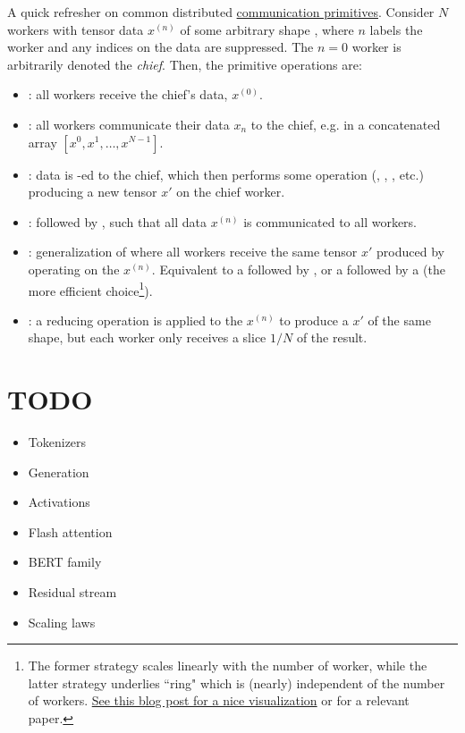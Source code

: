 \documentclass[11pt]{article}
\begin{document}
A quick refresher on common distributed
\href{https://docs.nvidia.com/deeplearning/nccl/user-guide/docs/usage/collectives.html}{communication
primitives}.  Consider $ N $ workers with tensor data $ x ^{ (n) }  $ of some arbitrary shape
, where $ n $ labels the worker and any indices on the data are suppressed. The $
n=0 $ worker is arbitrarily denoted the \textit{chief}.  Then, the primitive operations are:
\begin{itemize}
    \item {}: all workers receive  the chief's data, $ x ^{ (0) }  $.
    \item {}: all workers communicate their data $ x _{ n } $ to the chief, e.g. in a
        concatenated array $ [x ^{ 0 }, x ^{ 1 }, \ldots , x ^{ N-1 }] $.
    \item {}: data is -ed to the chief, which then performs some
        operation (, , , etc.) producing a new tensor $
        x' $ on the chief worker.
    \item {}:  followed by , such that all
        data $ x ^{ (n) } $ is communicated to all workers.
    \item {}: generalization of  where all
        workers receive the same tensor $ x' $ produced by operating on the $ x ^{ (n) } $.
        Equivalent to a  followed by , or a
         followed by a  (the more efficient
        choice\footnote{The former strategy scales linearly with the number of worker, while the
            latter strategy underlies ``ring"  which is (nearly) independent of
            the number of workers.
            \href{https://andrew.gibiansky.com/blog/machine-learning/baidu-allreduce/}{See this blog
                post for a nice visualization} or \cite{bandwidthOptimalAllReduce2009} for a
            relevant paper.\label{foot_all_reduce}}).
    \item {}: a reducing operation is applied to the $ x ^{ (n) } $ to produce
        a $ x' $ of the same shape, but each worker only receives a slice $ 1/N $ of the result.
\end{itemize}



 \section{TODO}


 \begin{itemize}
 \item Tokenizers
 \item Generation
 \item Activations
 \item Flash attention
 \item BERT family
 \item Residual stream
 \item Scaling laws
 \end{itemize}



\end{document}
